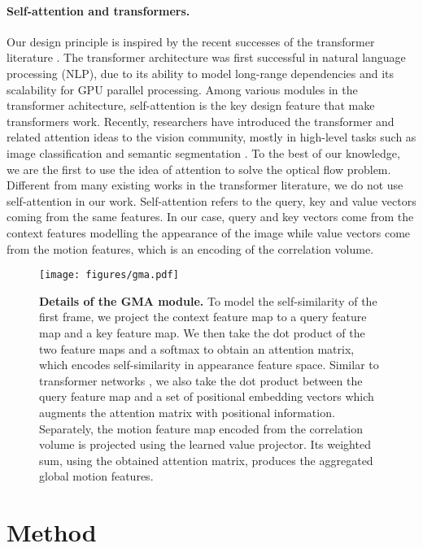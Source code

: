 \documentclass[10pt,twocolumn,letterpaper]{article}
\begin{document}
\paragraph{Self-attention and transformers.}
Our design principle is inspired by the recent successes of the transformer literature \cite{transformer}. 
The transformer architecture was first successful in natural language processing (NLP), 
due to its ability to model long-range dependencies and its scalability for GPU parallel processing. 
Among various modules in the transformer achitecture, self-attention is the key design feature that make transformers
work. Recently, researchers have introduced the transformer and related attention ideas to the vision 
community, mostly in high-level tasks such as image classification \cite{standalone, vit} 
and semantic segmentation \cite{dual, nonlocal, crisscross}. 
To the best of our knowledge, we are the first to use the idea of attention
to solve the optical flow problem. Different from many existing works in the transformer
literature, we do not use self-attention in our work. 
Self-attention refers to the query, key and value vectors coming from the same features. In our case, 
query and key vectors come from the context features modelling the appearance of the image while 
value vectors come from the motion features, which is an encoding of the correlation volume.  


\begin{figure*}[t!]
    \centering
    \texttt{[image: figures/gma.pdf]}
    \caption{
    \textbf{Details of the GMA module.}
    To model the self-similarity of the first frame, we 
    project the context feature map to a query feature map and a key feature map. We then
    take the dot product of the two feature maps and a softmax to obtain an attention matrix, which 
    encodes self-similarity in appearance feature space. Similar to transformer networks \cite{transformer}, we also take the 
    dot product between the query feature map and a set of positional embedding vectors 
    which augments the attention matrix with positional information.       
    Separately, the motion feature map encoded from the correlation volume is projected using the learned value
    projector. Its weighted sum, using the obtained attention matrix, produces the aggregated global motion features.}
    \label{fig:details}
\end{figure*} \section{Method}
\label{Sec:method}
\end{document}
